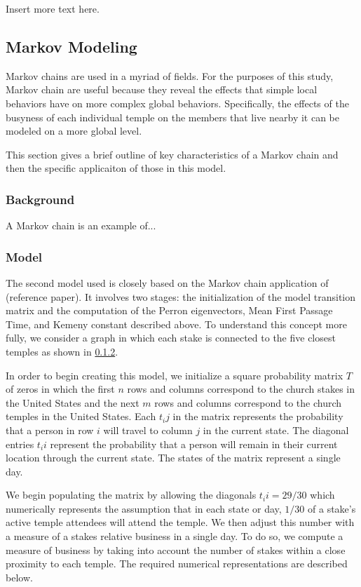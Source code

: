 \documentclass[twoside,twocolumn]{article}
\begin{document}
Insert more text here.


\subsection{Markov Modeling}

Markov chains are used in a myriad of fields. For the purposes of this study, Markov chain are useful because they reveal the effects that simple local behaviors have on more complex global behaviors. Specifically, the effects of the busyness of each individual temple on the members that live nearby it can be modeled on a more global level.

This section gives a brief outline of key characteristics of a Markov chain and then the specific applicaiton of those in this model.

\subsubsection{Background}

A Markov chain is an example of...

\subsubsection{Model}
The second model used is closely based on the Markov chain application of (reference paper). It involves two stages: the initialization of the model transition matrix and the computation of the Perron eigenvectors, Mean First Passage Time, and Kemeny constant described above. To understand this concept more fully, we consider a graph in which each stake is connected to the five closest temples as shown in \ref{}.

In order to begin creating this model, we initialize a square probability matrix $T$ of zeros in which the first $n$ rows and columns correspond to the church stakes in the United States and the next $m$ rows and columns correspond to the church temples in the United States. Each $t_ij$ in the matrix represents the probability that a person in row $i$ will travel to column $j$ in the current state. The diagonal entries $t_ii$ represent the probability that a person will remain in their current location through the current state. The states of the matrix represent a single day.

We begin populating the matrix by allowing the diagonals $t_ii = 29/30$ which numerically represents the assumption that in each state or day, $1/30$ of a stake's active temple attendees will attend the temple. We then adjust this number with a measure of a stakes relative business in a single day. To do so, we compute a measure of business by taking into account the number of stakes within a close proximity to each temple. The required numerical representations are described below.
\end{document}
